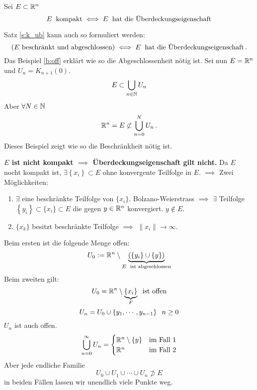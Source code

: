 \begin{Sat} \label{s:k_ub}
  Sei $E\subset\mathbb{R}^n$
  \[E\hspace{2mm}\text{kompakt}\iff E\hspace{2mm}\text{hat die Überdeckungseigenschaft}\]
\end{Sat}
\begin{Bem} Satz \ref{s:k_ub} kann auch so formuliert werden:
\[
(\mbox{$E$ beschr\"ankt und abgeschlossen}) \iff E\hspace{2mm}\text{hat die Überdeckungseigenschaft}\, .\]
Das Beispiel \ref{b:off} erkl\"art wie so die Abgeschlossenheit n\"otig ist.
Sei nun $E=\mathbb{R}^n$ und $U_n=K_{n+1}(0)$.
  \[E\subset \bigcup_{n\in\mathbb{N}} U_n\]
  Aber $\forall N\in\mathbb{N}$
  \[\mathbb{R}^n=E\not\subset \bigcup_{n=0}^N U_n\, .\]
Dieses Beispiel zeigt wie so die Beschr\"ankheit n\"otig ist.
\end{Bem}
\begin{Bew} 
{\bf $E$ ist nicht kompakt $\implies$ Überdeckungseigenschaft gilt nicht.}
Da $E$ nocht kompakt ist,   $\exists \left\{ x_i \right\}\subset E$ ohne konvergente Teilfolge in $E$. 
$\implies$  Zwei Möglichkeiten:
  \begin{enumerate}
    \item $\exists$ eine beschr\"ankte Teilfolge von $\{x_i\}$. Bolzano-Weierstrass $\implies$
$\exists$ Teilfolge $\left\{ y_i \right\}\subset \{x_i\}\subset E$ die gegen $y\in \mathbb{R}^n$
konvergiert. $y\not\in E$.
    \item $\{x_k\}$ besitzt beschr\"ankte Teilfolge $\implies$ $\|x_i\|\to \infty$.
  \end{enumerate}
  Beim ersten ist die folgende Menge offen: 
  \[U_0:=\mathbb{R}^n\setminus \underbrace{\left( \left\{ y_i \right\}\cup\left\{ y \right\} \right)}_{E\hspace{2mm}\text{ist abgeschlossen}}\]
  Beim zweiten gilt:
  \[U_0=\mathbb{R}^n\setminus\underbrace{\left\{ x_i \right\}}_{F}\hspace{2mm}\text{ist offen}\]
  \[U_n=U_0\cup \left\{ y_1,\cdots,y_{n-1} \right\} \hspace{2mm} n\geq 0\]
  $U_n$ ist auch offen.
  \[\bigcup_{n=0}^{\infty}U_n= \begin{cases}
    \mathbb{R}^n\setminus \left\{ y \right\}& \text{im Fall 1}\\
    \mathbb{R}^n & \text{im Fall 2}
  \end{cases}\]
  Aber jede endliche Familie
  \[U_0\cup U_1\cup \cdots\cup U_n\not\supset E\]
  in beiden Fällen lassen wir unendlich viele Punkte weg.

\bigskip


\end{Bew}
